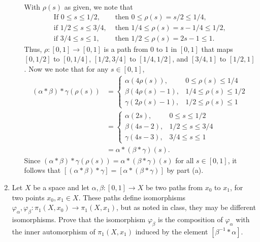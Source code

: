 \documentclass[letterpaper,12pt]{article}
\newcommand{\cla}[1]{\left[ #1\right]}
\begin{document}
\begin{enumerate}
\begin{enumerate}
With $\rho(s)$ as given, we note that 
\begin{align*}
 \text{If } 0\leq s\leq 1/2, &\text{ then } 0\leq \rho(s)=s/2\leq 1/4,\\
 \text{if } 1/2\leq s\leq 3/4, &\text{ then } 1/4\leq \rho(s)=s-1/4\leq 1/2,\\
 \text{if } 3/4\leq s\leq 1, &\text{ then } 1/2\leq \rho(s) = 2s-1 \leq 1.
\end{align*}
Thus, $\rho:[0,1]\to [0,1]$ is a path from 0 to 1 in $[0,1]$ that maps $[0,1/2]$ to $[0,1/4]$, $[1/2,3/4]$ to $[1/4,1/2]$, and $[3/4,1]$ to $[1/2,1]$. Now we note that for any $s\in [0,1]$,
\begin{align*}
 (\alpha\ast\beta)\ast\gamma(\rho(s)) & = \begin{cases}
                                           \alpha(4\rho(s)), & 0\leq \rho(s)\leq 1/4\\
					   \beta(4\rho(s)-1), & 1/4\leq \rho(s)\leq 1/2\\
					   \gamma(2\rho(s)-1), & 1/2\leq \rho(s)\leq 1
                                          \end{cases}\\
& = \begin{cases}
     \alpha(2s), & 0\leq s\leq 1/2\\
     \beta(4s-2), & 1/2\leq s\leq 3/4\\
     \gamma(4s-3), & 3/4\leq s\leq 1
    \end{cases}\\
& = \alpha\ast(\beta\ast\gamma)(s).
\end{align*}
Since $(\alpha\ast\beta)\ast\gamma(\rho(s)) = \alpha\ast(\beta\ast\gamma)(s)$ for all $s\in [0,1]$, it follows that $\cla{(\alpha\ast\beta)\ast\gamma} = \cla{\alpha\ast(\beta\ast\gamma)}$ by part (a).
\end{enumerate}

\bigskip

\item Let $X$ be a space and let $\alpha,\beta:[0,1]\to X$ be two paths from $x_0$ to $x_1$, for two points $x_0,x_1\in X$. These paths define isomorphisms $\varphi_\alpha,\varphi_\beta:\pi_1(X,x_0)\to \pi_1(X,x_1)$, but as noted in class, they may be different isomorphisms. Prove that the isomorphism $\varphi_\beta$ is the composition of $\varphi_\alpha$ with the inner automorphism of $\pi_1(X,x_1)$ induced by the element $\cla{\beta^{-1}\ast\alpha}$.

\bigskip


\end{enumerate}
\end{document}
